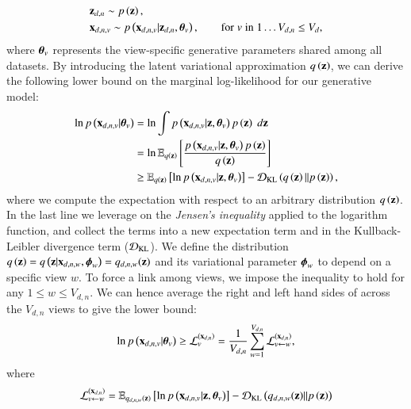 \begin{equation}\label{eq:model}
\begin{aligned}
&\z_{d,n} \sim \p{\z}, \\  %
&\xdnv \sim \p{\xdnv|\z_{d,n},\thetab_v},  %
\qquad \textnormal {for} \; v \; \textnormal{in} \; 1 \ldots V_{d,n} \leq V_d,
\end{aligned}
\end{equation}
where $\boldsymbol{\theta}_v$ represents the view-specific generative parameters shared among all datasets.
By introducing the latent variational approximation $q\left(\mathbf{z}\right)$, we can derive the following lower bound on the marginal log-likelihood for our generative model:
\begin{equation}\label{eq:LB}
\begin{aligned}
\ln p\left(\mathbf{x}_{d,n,v}|\boldsymbol{\theta}_v\right) &= \ln \int p\left(\mathbf{x}_{d,n,v}|\mathbf{z}, \boldsymbol{\theta}_v\right) p\left(\mathbf{z}\right) \; d\mathbf{z} \\
                        &= \ln \operatorname{\mathbb{E}}_{q\left(\mathbf{z}\right)}\left[\frac{p\left(\mathbf{x}_{d,n,v}|\mathbf{z}, \boldsymbol{\theta}_v\right) p\left(\mathbf{z}\right)}{q\left(\mathbf{z}\right)}\right] \\
                        &\geq \operatorname{\mathbb{E}}_{q\left(\mathbf{z}\right)}\left[\ln p\left(\mathbf{x}_{d,n,v}|\mathbf{z}, \boldsymbol{\theta}_v\right)\right] - \operatorname{\mathcal{D}_{KL}}\left(q\left(\mathbf{z}\right)||p\left(\mathbf{z}\right)\right),
\end{aligned}
\end{equation}
where we compute the expectation with respect to an arbitrary distribution $q\left(\mathbf{z}\right)$.
In the last line we leverage on the \textit{Jensen's inequality} applied to the logarithm function, and collect the terms into a new expectation term and in the Kullback-Leibler divergence term ($\operatorname{\mathcal{D}_{KL}}$).
We define the distribution $q\left(\mathbf{z}\right) = q\left(\mathbf{z}|\mathbf{x}_{d,n,w}, \boldsymbol{\phi}_w\right) = q_{d,n,w}(\mathbf{z})$ and its variational parameter $\boldsymbol{\phi}_w$ to depend on a specific view $w$.
To force a link among views, we impose the inequality  to hold for any $1 \leq w \leq V_{d,n}$.
We can hence average the right and left hand sides of  across the $V_{d,n}$ views to give the lower bound:
\begin{equation}\label{eq:newLB}
\begin{aligned}
\ln p\left(\mathbf{x}_{d,n,v}|\boldsymbol{\theta}_v\right) \geq \mathcal{L}_v^{(\mathbf{x}_{d,n})} = \frac{1}{V_{d,n}} \sum_{w=1}^{V_{d,n}} \mathcal{L}_{v \leftarrow w}^{(\mathbf{x}_{d,n})},
\end{aligned}
\end{equation}
where
\begin{equation}\label{eq:LBdnvw}
\begin{aligned}
\mathcal{L}_{v \leftarrow w}^{(\mathbf{x}_{d,n})} = \operatorname{\mathbb{E}}_{q_{d,n,w}(\mathbf{z})}\left[\ln p\left(\mathbf{x}_{d,n,v}|\mathbf{z}, \boldsymbol{\theta}_v\right)\right] - \operatorname{\mathcal{D}_{KL}}\left(q_{d,n,w}(\mathbf{z})||p\left(\mathbf{z}\right)\right)
\end{aligned}
\end{equation}
